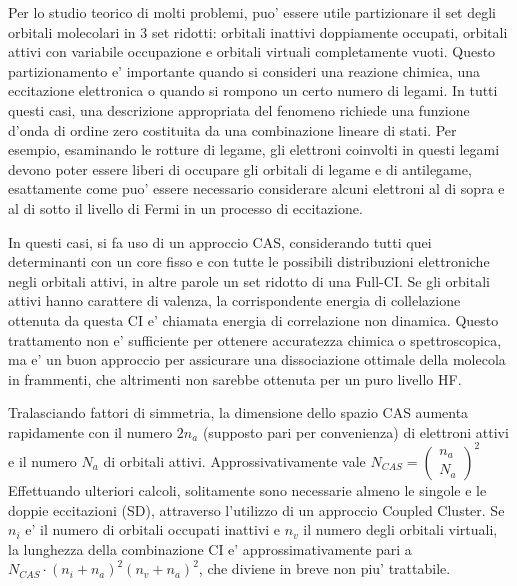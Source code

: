 Per lo studio teorico di molti problemi, puo' essere utile partizionare
il set degli orbitali molecolari in 3 set ridotti: orbitali inattivi
doppiamente occupati, orbitali attivi con variabile occupazione e
orbitali virtuali completamente vuoti.  Questo partizionamento e'
importante quando si consideri una reazione chimica, una eccitazione
elettronica o quando si rompono un certo numero di legami. In tutti
questi casi, una descrizione appropriata del fenomeno richiede
una funzione d'onda di ordine zero costituita da una combinazione
lineare di stati.  Per esempio, esaminando le rotture di legame,
gli elettroni coinvolti in questi legami devono poter essere liberi
di occupare gli orbitali di legame e di antilegame, esattamente come
puo' essere necessario considerare alcuni elettroni al di sopra e al
di sotto il livello di Fermi in un processo di eccitazione.

In questi casi, si fa uso di un approccio CAS, considerando tutti quei
determinanti con un core fisso e con tutte le possibili distribuzioni
elettroniche negli orbitali attivi, in altre parole un set ridotto
di una Full-CI.  Se gli orbitali attivi hanno carattere di valenza,
la corrispondente energia di collelazione ottenuta da questa CI e'
chiamata energia di correlazione non dinamica.  Questo trattamento
non e' sufficiente per ottenere accuratezza chimica o spettroscopica,
ma e' un buon approccio per assicurare una dissociazione ottimale
della molecola in frammenti, che altrimenti non sarebbe ottenuta per
un puro livello HF.

Tralasciando fattori di simmetria, la dimensione dello spazio
CAS aumenta rapidamente con il numero $2n_a$ (supposto pari per
convenienza) di elettroni attivi e il numero $N_a$ di orbitali
attivi. Approssivativamente vale $
N_{CAS}=\left(
\begin{array}{c}
n_a \\
N_a
\end{array}
\right)^2
$
Effettuando ulteriori calcoli, solitamente sono necessarie almeno
le singole e le doppie eccitazioni (SD), attraverso l'utilizzo di un
approccio Coupled Cluster. Se $n_i$ e' il numero di orbitali occupati
inattivi e $n_v$ il numero degli orbitali virtuali, la lunghezza della
combinazione CI e' approssimativamente pari a $N_{CAS}\cdot\left(n_i
+ n_a\right)^2 \left( n_v + n_a \right)^2$, che diviene in breve non
piu' trattabile.

